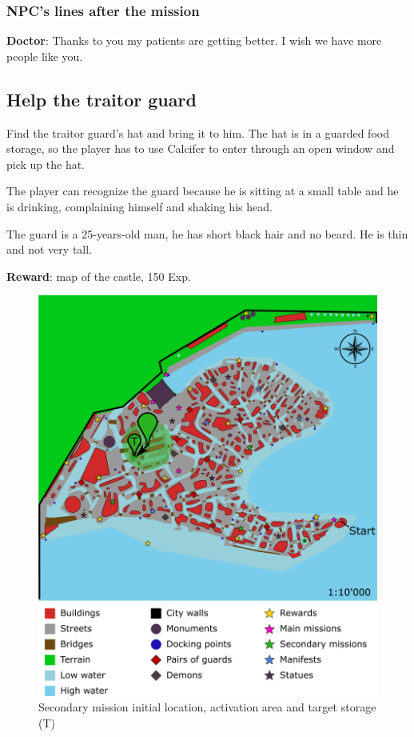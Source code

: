 \subsubsection*{NPC's lines after the mission}
\textbf{Doctor}: Thanks to you my patients are getting better. I wish we have more people like you.


\subsection{Help the traitor guard}
Find the traitor guard's hat and bring it to him. The hat is in a guarded food storage, so the player has to use Calcifer to enter through an open window and pick up the hat.

The player can recognize the guard because he is sitting at a small table and he is drinking, complaining himself and shaking his head.

The guard is a 25-years-old man, he has short black hair and no beard. He is thin and not very tall.

\textbf{Reward}: map of the castle, 150 Exp.

\begin{figure}[H]
  \centering
  \includegraphics[width=\textwidth]{../Images/Maps/dynamiaSecondaryMissions_Guard}
  \caption{Secondary mission initial location, activation area and target storage (T)}
\end{figure}

